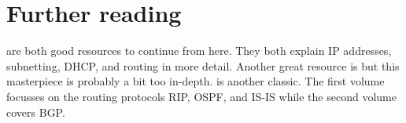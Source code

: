\section{Further reading}
\label{sec:ip-reading}
\textcite{lammle-ccna,lammle-comptia} are both good resources to continue from here.
They both explain \acs{IP} addresses, subnetting, \acs{DHCP}, and routing in more detail.
Another great resource is \textcite{stevens} but this masterpiece is probably a bit too in-depth.
\textcite{doyle} is another classic.
The first volume focusses on the routing protocols \acs{RIP}, \acs{OSPF}, and \acs{IS-IS} while the second volume covers \acs{BGP}.